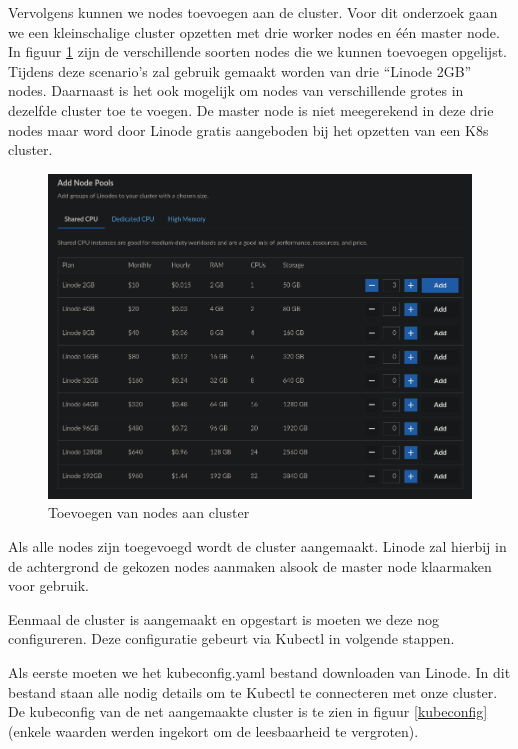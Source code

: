Vervolgens kunnen we nodes toevoegen aan de cluster. Voor dit onderzoek gaan we een kleinschalige cluster opzetten met drie worker nodes en één master node. In figuur \ref{fig:LinodeAddNodes} zijn de verschillende soorten nodes die we kunnen toevoegen opgelijst. Tijdens deze scenario's zal gebruik gemaakt worden van drie ``Linode 2GB'' nodes. Daarnaast is het ook mogelijk om nodes van verschillende grotes in dezelfde cluster toe te voegen. De master node is niet meegerekend in deze drie nodes maar word door Linode gratis aangeboden bij het opzetten van een K8s cluster.

\begin{figure}[h]
	\centering
	\includegraphics[width=\linewidth]{img/LinodeAddNodes.png}
	\caption{Toevoegen van nodes aan cluster}
	\label{fig:LinodeAddNodes}
\end{figure}

Als alle nodes zijn toegevoegd wordt de cluster aangemaakt. Linode zal hierbij in de achtergrond de gekozen nodes aanmaken alsook de master node klaarmaken voor gebruik. 

Eenmaal de cluster is aangemaakt en opgestart is moeten we deze nog configureren. Deze configuratie gebeurt via Kubectl in volgende stappen.

Als eerste moeten we het kubeconfig.yaml bestand downloaden van Linode. In dit bestand staan alle nodig details om te Kubectl te connecteren met onze cluster. De kubeconfig van de net aangemaakte cluster is te zien in figuur \ref{kubeconfig} (enkele waarden werden ingekort om de leesbaarheid te vergroten).

